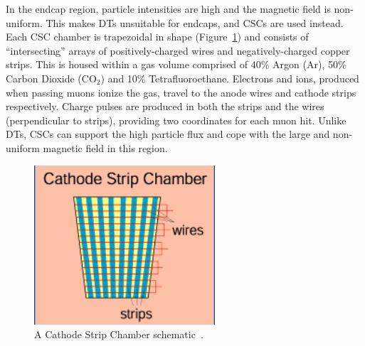 In the endcap region, particle intensities are high and the magnetic field is non-uniform. This makes DTs unsuitable for endcaps, and CSCs are used instead. Each CSC chamber is trapezoidal in shape (Figure~\ref{fig:csc}) and consists of ``intersecting'' arrays of positively-charged wires and  negatively-charged copper strips. This is housed within a gas volume comprised of 40\% Argon (Ar), 50\% Carbon Dioxide ($\mathrm{CO}_{2}$) and 10\% Tetrafluoroethane. Electrons and ions, produced when passing muons ionize the gas, travel to the anode wires and cathode strips respectively. Charge pulses are produced in both the strips and the wires (perpendicular to strips), providing two coordinates for each muon hit. Unlike DTs, CSCs can support the high particle flux and cope with the large and non-uniform magnetic field in this region.


\begin{figure}
  \begin{center}
  \captionsetup{justification=centering}
  \includegraphics[width=0.6\textwidth,keepaspectratio]{plots_and_figures/chapter3/CSC.png}
\caption{A Cathode Strip Chamber schematic~\cite{muon2}.}
\label{fig:csc}
\end{center}
\end{figure}

